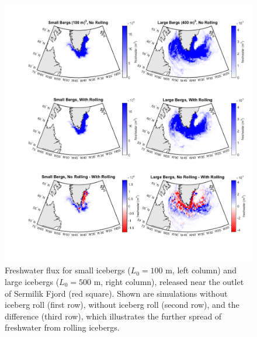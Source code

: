 \documentclass[twocol]{ametsoc_tw}
\begin{document}
 \begin{figure}[!t]
 \begin{center}
 \hspace{-.5 cm} \includegraphics[width=.8\linewidth]{Figs/With_Rolling_No_Rolling}
 \caption{Freshwater flux for small icebergs ($L_0 = 100$ m, left column) and large icebergs ($L_0 = 500$ m, right column), released near the outlet of Sermilik Fjord (red square). Shown are simulations without iceberg roll (first row), without iceberg roll (second row), and the difference (third row), which illustrates the further spread of freshwater from rolling icebergs.}
 \label{fig:bergschem}
 \end{center}
\end{figure}
\end{document}
